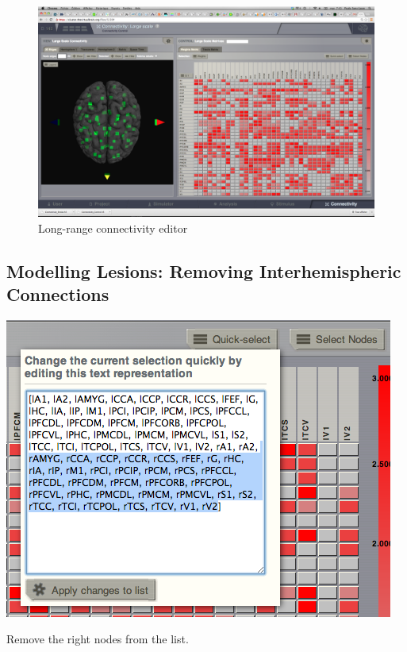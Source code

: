 \documentclass{tufte-handout}
\begin{document}
\begin{figure}[h]
  \includegraphics[width=\linewidth]{Handout_UI_ModellingStructuralLesions_ConnectivityArea}%
  \caption{Long-range connectivity editor}%
  \label{fig:fig}%
\end{figure}


\newpage
\subsection{Modelling Lesions: Removing Interhemispheric Connections}\label{sec:steps}

\begin{marginfigure}%
  \includegraphics[width=\linewidth]{Handout_UI_ModellingStructuralLesions_QuickSelectRemoveNodes}%
  \caption{Remove the right nodes from the list.}%
  \label{fig:quickselect_removenodes}%
\end{marginfigure}%
\end{document}
